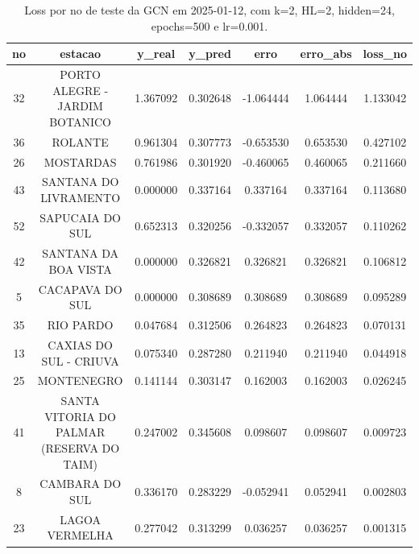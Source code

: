 \begin{table}[h]
\centering
\caption{Loss por no de teste da GCN em 2025-01-12, com k=2, HL=2, hidden=24, epochs=500 e lr=0.001.}
\label{tab:gcn_loss_k2_hl2_h24_e500_d20250112}
\begin{tabular}{ccccccc}
\toprule
no & estacao & y\_real & y\_pred & erro & erro\_abs & loss\_no \\
\midrule
32 & PORTO ALEGRE - JARDIM BOTANICO & 1.367092 & 0.302648 & -1.064444 & 1.064444 & 1.133042 \\
36 & ROLANTE & 0.961304 & 0.307773 & -0.653530 & 0.653530 & 0.427102 \\
26 & MOSTARDAS & 0.761986 & 0.301920 & -0.460065 & 0.460065 & 0.211660 \\
43 & SANTANA DO LIVRAMENTO & 0.000000 & 0.337164 & 0.337164 & 0.337164 & 0.113680 \\
52 & SAPUCAIA DO SUL & 0.652313 & 0.320256 & -0.332057 & 0.332057 & 0.110262 \\
42 & SANTANA DA BOA VISTA & 0.000000 & 0.326821 & 0.326821 & 0.326821 & 0.106812 \\
5 & CACAPAVA DO SUL & 0.000000 & 0.308689 & 0.308689 & 0.308689 & 0.095289 \\
35 & RIO PARDO & 0.047684 & 0.312506 & 0.264823 & 0.264823 & 0.070131 \\
13 & CAXIAS DO SUL - CRIUVA & 0.075340 & 0.287280 & 0.211940 & 0.211940 & 0.044918 \\
25 & MONTENEGRO & 0.141144 & 0.303147 & 0.162003 & 0.162003 & 0.026245 \\
41 & SANTA VITORIA DO PALMAR (RESERVA DO TAIM) & 0.247002 & 0.345608 & 0.098607 & 0.098607 & 0.009723 \\
8 & CAMBARA DO SUL & 0.336170 & 0.283229 & -0.052941 & 0.052941 & 0.002803 \\
23 & LAGOA VERMELHA & 0.277042 & 0.313299 & 0.036257 & 0.036257 & 0.001315 \\
\bottomrule
\end{tabular}
\end{table}
